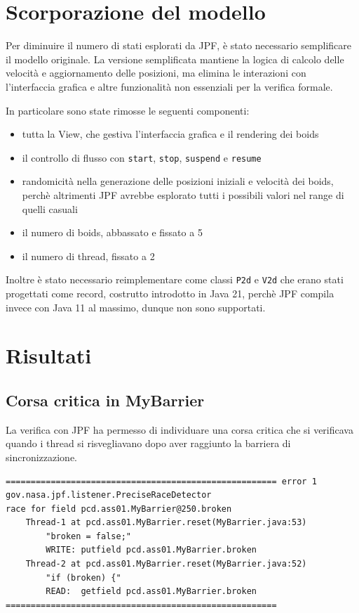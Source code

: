\documentclass[a4paper,12pt]{report}
\begin{document}
\section{Scorporazione del modello}
Per diminuire il numero di stati esplorati da JPF, è stato necessario semplificare il modello originale. La versione semplificata mantiene la logica di calcolo delle velocità e aggiornamento delle posizioni, ma elimina le interazioni con l'interfaccia grafica e altre funzionalità non essenziali per la verifica formale.

In particolare sono state rimosse le seguenti componenti:
\begin{itemize}
    \item tutta la View, che gestiva l'interfaccia grafica e il rendering dei boids
    \item il controllo di flusso con \texttt{start}, \texttt{stop}, \texttt{suspend} e \texttt{resume} 
    \item randomicità nella generazione delle posizioni iniziali e velocità dei boids, perchè altrimenti JPF avrebbe esplorato tutti i possibili valori nel range di quelli casuali
    \item il numero di boids, abbassato e fissato a 5
    \item il numero di thread, fissato a 2
\end{itemize}

Inoltre è stato necessario reimplementare come classi \texttt{P2d} e \texttt{V2d} che erano stati progettati come record, costrutto introdotto in Java 21, perchè JPF compila invece con Java 11 al massimo, dunque non sono supportati.

\section{Risultati}

\subsection{Corsa critica in MyBarrier}
La verifica con JPF ha permesso di individuare una corsa critica che si verificava quando i thread si risvegliavano dopo aver raggiunto la barriera di sincronizzazione.

\begin{verbatim}
====================================================== error 1
gov.nasa.jpf.listener.PreciseRaceDetector
race for field pcd.ass01.MyBarrier@250.broken
    Thread-1 at pcd.ass01.MyBarrier.reset(MyBarrier.java:53)
        "broken = false;"  
        WRITE: putfield pcd.ass01.MyBarrier.broken
    Thread-2 at pcd.ass01.MyBarrier.reset(MyBarrier.java:52)
        "if (broken) {"  
        READ:  getfield pcd.ass01.MyBarrier.broken
====================================================== 
\end{verbatim}
\end{document}
